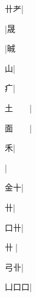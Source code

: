 \begin{multicols}{2}
{{\cjk{}{\cnsym{}　}卄耂}|{}\par
{\cjk{}{\cnsym{}　}{\cnsym{}　}{\cnsym{}　}}|{\cjk{}晟}\par
{\cjk{}{\cnsym{}　}{\cnsym{}　}{\cnsym{}　}}|{\cjk{}晠}\par
{山}|{}\par
{\cjk{}{\cnsym{}　}{\cnsym{}　}疒}|{}\par
{\cjk{}土{\cnsym{}　}{\cnsym{}　}}|{}\par
{\cjk{}面{\cnsym{}　}{\cnsym{}　}}|{}\par
{\cjk{}{\cnsym{}　}{\cnsym{}　}禾}|{}\par
{\cjk{}{\cnsym{}　}{\cnsym{}　}{\cnsym{}　}}|{}\par
{\cjk{}{\cnsym{}　}金十}|{}\par
{\cjk{}{\cnsym{}　}{\cnsym{}　}卄}|{}\par
{\cjk{}{\cnsym{}　}口卄}|{}\par
{\cjk{}{\cnsym{}　}卄{\cnjzr{}}}|{}\par
{\cjk{}{\cnsym{}　}弓卝}|{}\par
{\cjk{}凵口口}|{}\par
}
\end{multicols}
